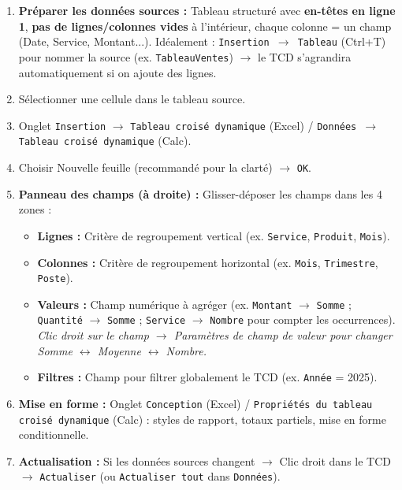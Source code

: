 \documentclass[11pt]{article}
\begin{document}
\begin{methode}
\begin{enumerate}
    \item \textbf{Préparer les données sources :} Tableau structuré avec \textbf{en-têtes en ligne 1}, \textbf{pas de lignes/colonnes vides} à l'intérieur, chaque colonne = un champ (Date, Service, Montant...). Idéalement : \texttt{Insertion $\rightarrow$ Tableau} (Ctrl+T) pour nommer la source (ex. \texttt{TableauVentes}) $\rightarrow$ le TCD s'agrandira automatiquement si on ajoute des lignes.
    \item Sélectionner une cellule dans le tableau source.
    \item Onglet \texttt{Insertion} $\rightarrow$ \texttt{Tableau croisé dynamique} (Excel) / \texttt{Données $\rightarrow$ Tableau croisé dynamique} (Calc).
    \item Choisir \og Nouvelle feuille \fg (recommandé pour la clarté) $\rightarrow$ \texttt{OK}.
    \item \textbf{Panneau des champs (à droite) :} Glisser-déposer les champs dans les 4 zones :
    \begin{itemize}
        \item \textbf{Lignes :} Critère de regroupement vertical (ex. \texttt{Service}, \texttt{Produit}, \texttt{Mois}).
        \item \textbf{Colonnes :} Critère de regroupement horizontal (ex. \texttt{Mois}, \texttt{Trimestre}, \texttt{Poste}).
        \item \textbf{Valeurs :} Champ numérique à agréger (ex. \texttt{Montant} $\rightarrow$ \texttt{Somme} ; \texttt{Quantité} $\rightarrow$ \texttt{Somme} ; \texttt{Service} $\rightarrow$ \texttt{Nombre} pour compter les occurrences). \emph{Clic droit sur le champ $\rightarrow$ Paramètres de champ de valeur pour changer Somme $\leftrightarrow$ Moyenne $\leftrightarrow$ Nombre.}
        \item \textbf{Filtres :} Champ pour filtrer globalement le TCD (ex. \texttt{Année} = 2025).
    \end{itemize}
    \item \textbf{Mise en forme :} Onglet \texttt{Conception} (Excel) / \texttt{Propriétés du tableau croisé dynamique} (Calc) : styles de rapport, totaux partiels, mise en forme conditionnelle.
    \item \textbf{Actualisation :} Si les données sources changent $\rightarrow$ Clic droit dans le TCD $\rightarrow$ \texttt{Actualiser} (ou \texttt{Actualiser tout} dans \texttt{Données}).
\end{enumerate}
\end{methode}
\end{document}
